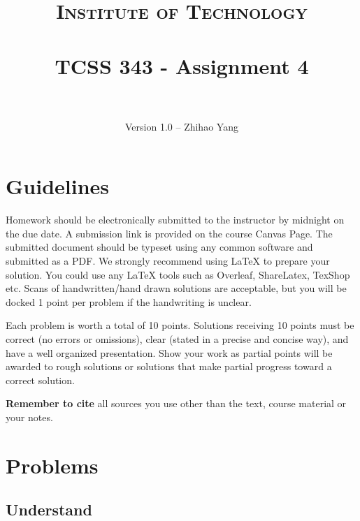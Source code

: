 \documentclass[paper=a4, fontsize=11pt]{scrartcl}
\title{
		\usefont{OT1}{bch}{b}{n}
		\normalfont \normalsize \textsc{Institute of Technology} \\ [25pt]
		\horrule{0.5pt} \\[0.4cm]
		\huge TCSS 343 - Assignment 4\\
		\horrule{2pt} \\[0.5cm]
}
\author{
		\normalfont 								\normalsize
        Version 1.0 --  Zhihao Yang \\
}
\numberwithin{equation}{section}		%
\numberwithin{figure}{section}			%
\numberwithin{table}{section}				%
\begin{document}
\maketitle

\section{Guidelines}
Homework should be electronically submitted to the instructor by midnight on the due date.  A submission link is provided on the course Canvas Page.  The submitted document should be typeset using any common software and submitted as a PDF.  We strongly recommend using \LaTeX\;  to prepare your solution.  You could use any \LaTeX\; tools such as Overleaf, ShareLatex, TexShop etc. Scans of handwritten/hand drawn solutions are acceptable, but you will be docked 1 point per problem if the handwriting is unclear.

Each problem is worth a total of 10 points.  Solutions receiving 10 points must be correct (no errors or omissions), clear (stated in a precise and concise way), and have a well organized presentation.  Show your work as partial points will be awarded to rough solutions or solutions that make partial progress toward a correct solution.

\textbf{Remember to cite} all sources you use other than the text, course material or your notes.

\newpage
\section{Problems}

\subsection{Understand}
\end{document}
